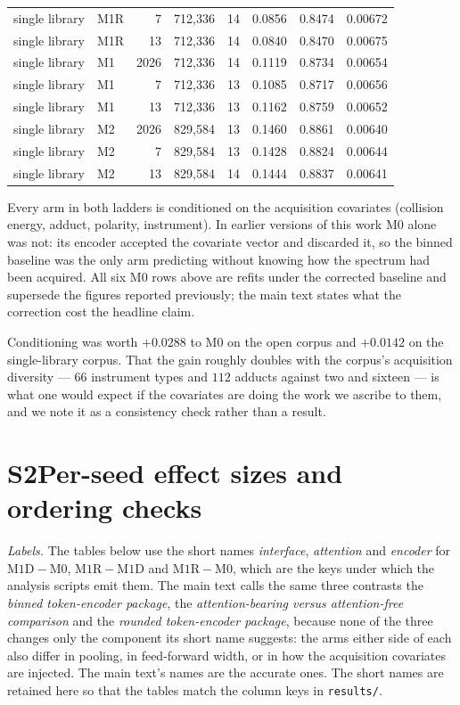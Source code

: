 \documentclass[11pt]{article}
\begin{document}
\begin{table}[htbp]
\begin{tabular}{l l r r r r r r}
single library & M1R & 7    & 712,336   & 14 & 0.0856 & 0.8474 & 0.00672 \\
single library & M1R & 13   & 712,336   & 14 & 0.0840 & 0.8470 & 0.00675 \\
single library & M1  & 2026 & 712,336   & 14 & 0.1119 & 0.8734 & 0.00654 \\
single library & M1  & 7    & 712,336   & 13 & 0.1085 & 0.8717 & 0.00656 \\
single library & M1  & 13   & 712,336   & 13 & 0.1162 & 0.8759 & 0.00652 \\
single library & M2  & 2026 & 829,584   & 13 & 0.1460 & 0.8861 & 0.00640 \\
single library & M2  & 7    & 829,584   & 13 & 0.1428 & 0.8824 & 0.00644 \\
single library & M2  & 13   & 829,584   & 14 & 0.1444 & 0.8837 & 0.00641 \\
\bottomrule
\end{tabular}
\end{table}

Every arm in both ladders is conditioned on the acquisition covariates (collision
energy, adduct, polarity, instrument). In earlier versions of this work M0 alone was
not: its encoder accepted the covariate vector and discarded it, so the binned
baseline was the only arm predicting without knowing how the spectrum had been
acquired. All six M0 rows above are refits under the corrected baseline and
supersede the figures reported previously; the main text states what the correction
cost the headline claim.

Conditioning was worth $+0.0288$ to M0 on the open corpus and $+0.0142$ on the
single-library corpus. That the gain roughly doubles with the corpus's acquisition
diversity --- $66$ instrument types and $112$ adducts against two and sixteen ---
is what one would expect if the covariates are doing the work we ascribe to them,
and we note it as a consistency check rather than a result.

\section*{S2\quad Per-seed effect sizes and ordering checks}

\emph{Labels.} The tables below use the short names \emph{interface}, \emph{attention}
and \emph{encoder} for $\mathrm{M1D}-\mathrm{M0}$, $\mathrm{M1R}-\mathrm{M1D}$ and
$\mathrm{M1R}-\mathrm{M0}$, which are the keys under which the analysis scripts emit
them. The main text calls the same three contrasts the \emph{binned token-encoder
package}, the \emph{attention-bearing versus attention-free comparison} and the
\emph{rounded token-encoder package}, because none of the three changes only the
component its short name suggests: the arms either side of each also differ in
pooling, in feed-forward width, or in how the acquisition covariates are injected.
The main text's names are the accurate ones. The short names are retained here so
that the tables match the column keys in \texttt{results/}.
\end{document}
